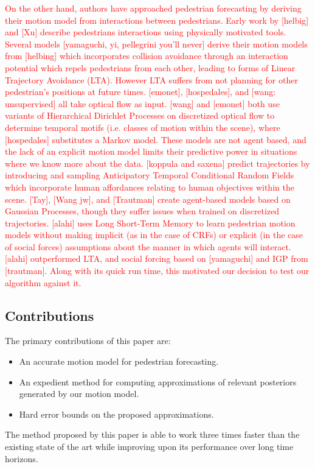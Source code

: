 \documentclass[letterpaper,10pt,conference]{ieeeconf}
\newcommand{\rtext}[1]{\textcolor{red}{#1}}
\begin{document}
\rtext{On the other hand, authors have approached pedestrian forecasting by deriving their motion model from interactions between pedestrians. Early work by [helbig] and [Xu] describe pedestrians interactions using physically motivated tools. Several models [yamaguchi, yi, pellegrini you’ll never] derive their motion models from [helbing] which incorporates collision avoidance through an interaction potential which repels pedestrians from each other, leading to forms of Linear Trajectory Avoidance (LTA). However LTA suffers from not planning for other pedestrian’s positions at future times. [emonet], [hospedales], and [wang: unsupervised] all take optical flow as input. [wang] and [emonet] both use variants of Hierarchical Dirichlet Processes on discretized optical flow to determine temporal motifs (i.e. classes of motion within the scene), where [hospedales] substitutes a Markov model. These models are not agent based, and the lack of an explicit motion model limits their predictive power in situations where we know more about the data. [koppula and saxena] predict trajectories by introducing and sampling Anticipatory Temporal Conditional Random Fields which incorporate human affordances relating to human objectives within the scene. [Tay], [Wang jw], and [Trautman] create agent-based models based on Gaussian Processes, though they suffer issues when trained on discretized trajectories. [alahi] uses Long Short-Term Memory to learn pedestrian motion models without making implicit (as in the case of CRFs) or explicit (in the case of social forces) assumptions about the manner in which agents will interact. [alahi] outperformed LTA, and social forcing based on [yamaguchi]  and IGP from [trautman]. Along with its quick run time, this motivated our decision to test our algorithm against it. }



\subsection{Contributions}

The primary contributions of this paper are:
\begin{itemize}
	\item An accurate motion model for pedestrian forecasting.
	\item An expedient method for computing approximations of relevant posteriors generated by our motion model.
	\item Hard error bounds on the proposed approximations.
\end{itemize}
The method proposed by this paper is able to work three times faster than the existing state of the art while improving upon its performance over long time horizons.
\end{document}
